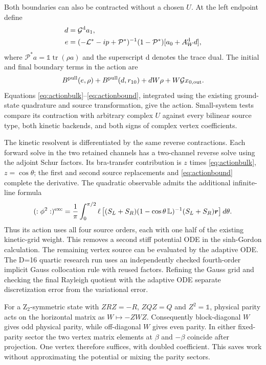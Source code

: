 \documentclass[11pt]{article}
\newcommand{\tr}{\operatorname{tr}}
\newcommand{\Id}{\mathbb{1}}
\newcommand{\LL}{\mathcal{L}}
\newcommand{\PP}{\mathcal{P}}
\newcommand{\GG}{\mathcal{G}}
\begin{document}
Both boundaries can also be contracted without a chosen $U$. At the left
endpoint define
\begin{align}
 d&=\GG^{\rm d}a_1,\\
 e&=(-\LL^*-ip+\PP^*)^{-1}(1-\PP^*)
                         [a_0+A_W^{\rm d}d],
\end{align}
where $\PP^*a=\Id\tr(\rho a)$ and the superscript d denotes the trace dual.
The initial and final boundary terms in the action are
\begin{equation}
 B^{\rm pull}(e,\rho)+B^{\rm pull}(d,r_{10})+dW\rho
                        +W\GG x_{0,\rm out}.
 \label{eq:actionbound}
\end{equation}
Equations \eqref{eq:actionbulk}--\eqref{eq:actionbound}, integrated using the
existing ground-state quadrature and source transformation, give the action.
Small-system tests compare its contraction with arbitrary complex $U$
against every bilinear source type, both kinetic backends, and both signs
of complex vertex coefficients.

The kinetic resolvent is differentiated by the same reverse contractions.
Each forward solve in the two retained channels has a two-channel reverse
solve using the adjoint Schur factors. Its bra-transfer contribution is
$z$ times \eqref{eq:actionbulk}, $z=\cos\theta$; the first and second source
replacements and \eqref{eq:actionbound} complete the derivative.
The quadratic observable admits the additional infinite-line formula
\begin{equation}
 (:\phi^2:)^{\rm exc}=\frac1\pi\int_0^{\pi/2}
 \ell\left[(S_L+S_R)(1-\cos\theta\,\mathbb L)^{-1}
                         (S_L+S_R)\bm r\right]d\theta.
\end{equation}
Thus its action uses all four source orders, each with one half of the
existing kinetic-grid weight. This removes a second stiff potential ODE
in the sinh-Gordon calculation. The remaining vertex source can be evaluated
by the adaptive ODE. The D=16 quartic research run uses an independently checked
fourth-order implicit Gauss collocation rule with reused factors. Refining
the Gauss grid and checking the final Rayleigh quotient with the adaptive
ODE separate discretization error from the variational error.

For a Z$_2$-symmetric state with $ZRZ=-R$, $ZQZ=Q$ and $Z^2=\Id$,
physical parity acts on the horizontal matrix as $W\mapsto-ZWZ$.
Consequently block-diagonal $W$ gives odd physical parity, while off-diagonal
$W$ gives even parity. In either fixed-parity sector the two vertex matrix
elements at $\beta$ and $-\beta$ coincide after projection. One vertex
therefore suffices, with doubled coefficient. This saves work without
approximating the potential or mixing the parity sectors.
\end{document}
